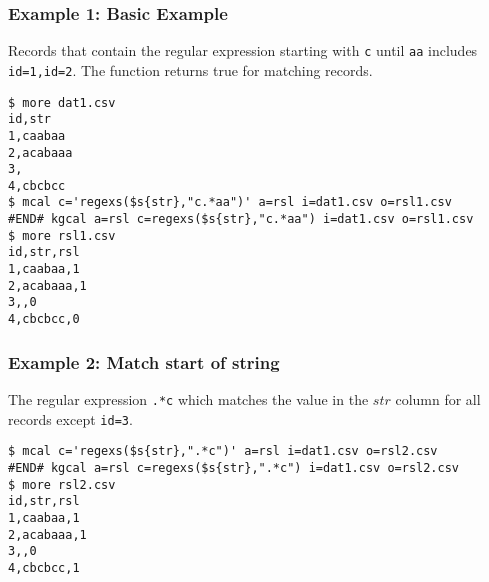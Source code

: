 \subsubsection*{Example 1: Basic Example}

Records that contain the regular expression starting with \verb|c| until \verb|aa| includes \verb|id=1,id=2|. The function returns true for matching records.


\begin{Verbatim}[baselinestretch=0.7,frame=single]
$ more dat1.csv
id,str
1,caabaa
2,acabaaa
3,
4,cbcbcc
$ mcal c='regexs($s{str},"c.*aa")' a=rsl i=dat1.csv o=rsl1.csv
#END# kgcal a=rsl c=regexs($s{str},"c.*aa") i=dat1.csv o=rsl1.csv
$ more rsl1.csv
id,str,rsl
1,caabaa,1
2,acabaaa,1
3,,0
4,cbcbcc,0
\end{Verbatim}
\subsubsection*{Example 2: Match start of string}

The regular expression \verb|.*c| which matches the value in the $str$ column for all records except \verb|id=3|.


\begin{Verbatim}[baselinestretch=0.7,frame=single]
$ mcal c='regexs($s{str},".*c")' a=rsl i=dat1.csv o=rsl2.csv
#END# kgcal a=rsl c=regexs($s{str},".*c") i=dat1.csv o=rsl2.csv
$ more rsl2.csv
id,str,rsl
1,caabaa,1
2,acabaaa,1
3,,0
4,cbcbcc,1
\end{Verbatim}
